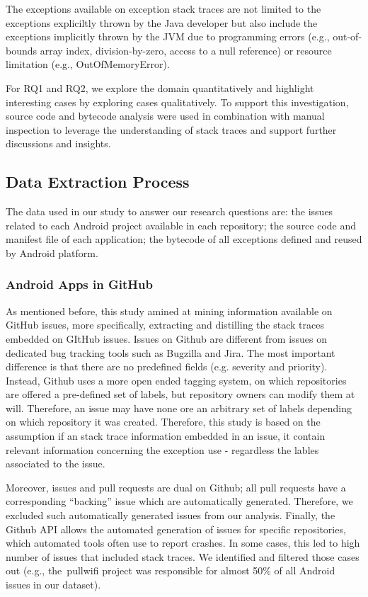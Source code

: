 \documentclass[conference]{IEEEtran}
\begin{document}
 
The exceptions available on exception stack traces are not limited to the exceptions 
expliciltly thrown by the Java developer but also include
the exceptions implicitly thrown by the JVM due to programming errors (e.g., out-of-bounds array index, division-by-zero, 
access to a null reference) or resource limitation (e.g., OutOfMemoryError).


For RQ1 and RQ2, we explore the domain quantitatively and highlight interesting cases by 
exploring cases qualitatively. To support this investigation, source code and bytecode 
analysis were used in combination with manual inspection to leverage the  understanding of stack traces and support further discussions and insights. 

\subsection{Data Extraction Process}
\label{sec:miningproc}

The data used in our study to answer our research questions are: the issues related to each 
Android project available in each repository; the source code and manifest file of each application;
the bytecode of all exceptions defined and reused by Android platform.

\subsubsection{Android Apps in GitHub}
\label{sec:git}

As mentioned before, this study amined at mining information available on GitHub issues,
more specifically, extracting and distilling the stack traces embedded on GItHub issues. 
Issues on Github are different from issues on dedicated bug tracking tools such as 
Bugzilla and Jira. The most important difference is that there are no predefined fields
  (e.g. severity and priority). Instead, Github uses a more open ended tagging system, on which
repositories are offered a pre-defined set of labels, but repository owners can modify 
them at will. Therefore, an issue may have none ore an arbitrary set of labels depending 
on which repository it was created. Therefore, this study is based on the assumption 
if an stack trace information embedded in an issue, it contain relevant information
 concerning the exception use -  regardless the lables associated to the issue.

Moreover, issues and pull requests are dual on Github; all pull requests have a corresponding 
``backing'' issue which
are automatically generated. Therefore, we excluded such automatically generated
issues from our analysis. Finally, the Github API allows the automated
generation of issues for specific repositories, which automated tools often use
to report crashes. In some cases, this led to high number of issues that
included stack traces. We identified and filtered those cases out (e.g.,
the~\textsf{pullwifi} project was responsible for almost 50\% of all Android issues in our dataset).
\end{document}

